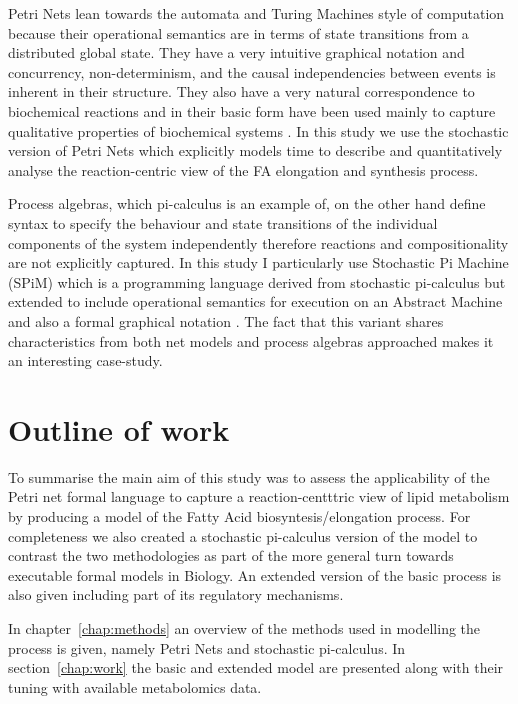 Petri Nets lean towards the automata and Turing Machines style of
computation because their operational semantics are in terms of state
transitions from a distributed global state. They have a very intuitive
graphical notation and concurrency,
non-determinism, and the causal independencies between events is
inherent in their structure. They
also have a very natural correspondence to biochemical reactions and
in their basic form have been used mainly to capture qualitative properties
of biochemical systems \cite [] {baldan2010petri}. In this study we use the stochastic version of
Petri Nets which explicitly models time to describe and quantitatively
analyse the
reaction-centric view of the FA elongation and synthesis
process.

Process algebras, which pi-calculus is an example of, on the other
hand define syntax to specify the behaviour and state transitions of the individual
components of the system independently therefore reactions and
compositionality are not explicitly captured. In this study I
particularly use Stochastic Pi Machine (SPiM) which is a programming
language derived from stochastic pi-calculus but extended to include
operational semantics for execution on an Abstract Machine and also a
formal graphical notation \cite [] {export:65224, export:65223}. The
fact that this variant shares
characteristics from both net models and process algebras approached
makes it an interesting case-study.

\section{Outline of work}
To summarise the main aim of this study was to assess the
applicability of the Petri net formal language to capture a
reaction-centttric view of lipid metabolism by producing a model of the
Fatty Acid biosyntesis/elongation process. For completeness we also
created a stochastic pi-calculus version of the model to contrast the
two methodologies as part of the more general turn towards executable
formal models in Biology. An extended version of the basic process is
also given including part of its regulatory mechanisms.

In chapter~\ref{chap:methods} an overview of the methods used in
modelling the process is given, namely Petri Nets and stochastic
pi-calculus. In section~\ref{chap:work} the basic and extended model
are presented along with their tuning with available metabolomics
data. 

